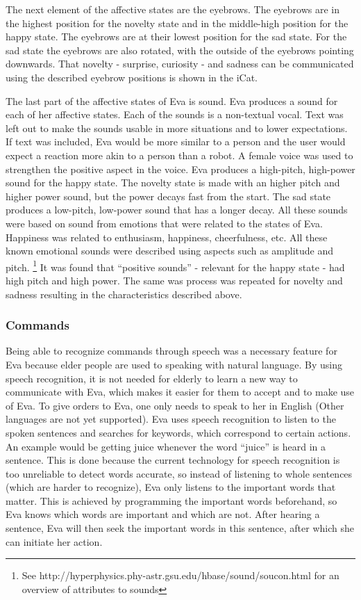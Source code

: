 \documentclass[project_eva.tex]{subfiles}
\begin{document}
The next element of the affective states are the eyebrows. The eyebrows are in the highest position for the novelty state and in the middle-high position for the happy state. The eyebrows are at their lowest position for the sad state. For the sad state the eyebrows are also rotated, with the outside of the eyebrows pointing downwards. That novelty - surprise, curiosity - and sadness can be communicated using the described eyebrow positions is shown in the iCat. \cite{iCat} 

The last part of the affective states of Eva is sound. Eva produces a sound for each of her affective states. Each of the sounds is a non-textual vocal. Text was left out to make the sounds usable in more situations and to lower expectations. If text was included, Eva would be more similar to a person and the user would expect a reaction more akin to a person than a robot. A female voice was used to strengthen the positive aspect in the voice. Eva produces a high-pitch, high-power sound for the happy state. The novelty state is made with an higher pitch and higher power sound, but the power decays fast from the start. The sad state produces a low-pitch, low-power sound that has a longer decay. All these sounds were based on sound from emotions that were related to the states of Eva. Happiness was related to enthusiasm, happiness, cheerfulness, etc. All these known emotional sounds were described using aspects such as amplitude and pitch. \footnote{See http://hyperphysics.phy-astr.gsu.edu/hbase/sound/soucon.html for an overview of attributes to sounds} It was found that ``positive sounds'' - relevant for the happy state - had  high pitch and high power. The same was process was repeated for novelty and sadness resulting in the characteristics described above.

\subsubsection*{Commands}
Being able to recognize commands through speech was a necessary feature for Eva because elder people are used to speaking 
with natural language. By using speech recognition, it is not needed for elderly to learn a new way to communicate with 
Eva, which makes it easier for them to accept and to make use of Eva. To give orders to Eva, one only needs to speak to 
her in English (Other languages are not yet supported). Eva uses speech recognition to listen to the spoken sentences and 
searches for keywords, which correspond to certain actions. An example would be getting juice whenever the word ``juice'' 
is heard in a sentence. This is done because the current technology for speech recognition is too unreliable to detect 
words accurate, so instead of listening to whole sentences (which are harder to recognize), Eva only listens to the 
important words that matter. This is achieved by programming the important words beforehand, so Eva knows which words are important and which are not. After hearing a sentence, Eva will then seek the important words in this sentence, after which she can initiate her action.
\end{document}
